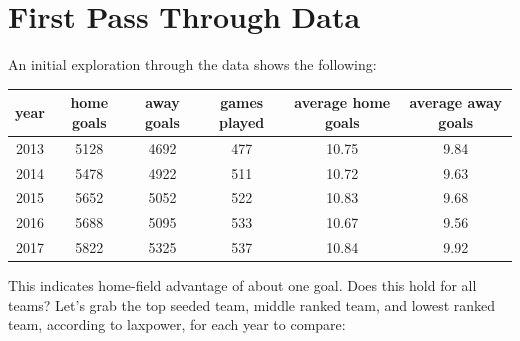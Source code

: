 \documentclass[11pt,a4paper]{article}
\begin{document}
\section*{First Pass Through Data}
An initial exploration through the data shows the following:

\begin{tabular}{| c || c | c | c | c | c |}
	\hline
	year & home goals & away goals & games played & average home goals & average away goals\\ \hline \hline
	2013 & 5128 & 4692 & 477 & 10.75 & 9.84 \\ \hline
	2014 & 5478 & 4922 & 511 & 10.72 & 9.63 \\ \hline
	2015 & 5652 & 5052 & 522 & 10.83 & 9.68 \\ \hline
	2016 & 5688 & 5095 & 533 & 10.67 & 9.56 \\ \hline
	2017 & 5822 & 5325 & 537 & 10.84 & 9.92 \\ 
	\hline
\end{tabular}

\vspace{5mm}
This indicates home-field advantage of about one goal. Does this hold for all teams? Let's grab the top seeded team, middle ranked team, and lowest ranked team, according to laxpower, for each year to compare:
\end{document}
